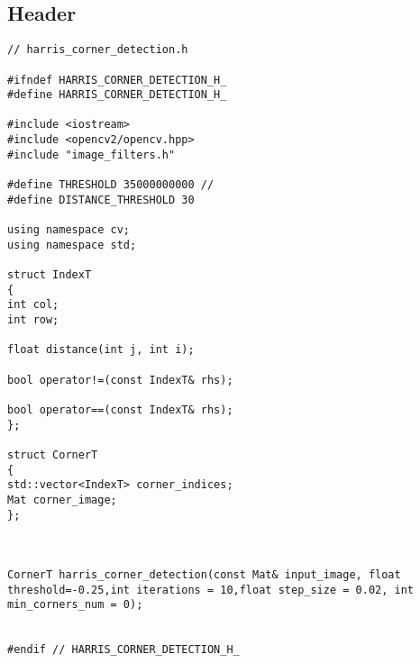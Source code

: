 \subsection{Header}
\begin{lstlisting}
// harris_corner_detection.h

#ifndef HARRIS_CORNER_DETECTION_H_
#define HARRIS_CORNER_DETECTION_H_

#include <iostream>
#include <opencv2/opencv.hpp>
#include "image_filters.h"

#define THRESHOLD 35000000000 //
#define DISTANCE_THRESHOLD 30

using namespace cv;
using namespace std;

struct IndexT
{
int col;
int row;

float distance(int j, int i);

bool operator!=(const IndexT& rhs);

bool operator==(const IndexT& rhs);
};

struct CornerT
{
std::vector<IndexT> corner_indices;
Mat corner_image;
};



CornerT harris_corner_detection(const Mat& input_image, float threshold=-0.25,int iterations = 10,float step_size = 0.02, int min_corners_num = 0);


#endif // HARRIS_CORNER_DETECTION_H_

\end{lstlisting}

\pagebreak

